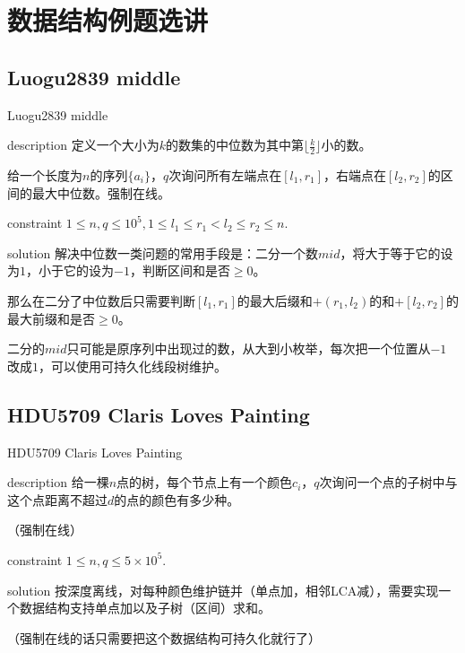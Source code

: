 \documentclass{beamer}
\begin{document}
\section{数据结构例题选讲}
\subsection{Luogu2839 middle}
\begin{frame}{Luogu2839 middle}
\begin{block}{description}
	定义一个大小为$k$的数集的中位数为其中第$\lfloor\frac{k}{2}\rfloor$小的数。
	
	给一个长度为$n$的序列$\{a_i\}$，$q$次询问所有左端点在$[l_1,r_1]$，右端点在$[l_2,r_2]$的区间的最大中位数。强制在线。
\end{block}
\begin{block}{constraint}
	$1 \le n, q \le 10^5, 1 \le l_1 \le r_1 < l_2 \le r_2 \le n.$
\end{block}
\pause
\begin{block}{solution}
	解决中位数一类问题的常用手段是：二分一个数$mid$，将大于等于它的设为$1$，小于它的设为$-1$，判断区间和是否$\ge 0$。
	
	那么在二分了中位数后只需要判断$[l_1,r_1]$的最大后缀和$+(r_1,l_2)$的和$+[l_2,r_2]$的最大前缀和是否$\ge 0$。
	
	二分的$mid$只可能是原序列中出现过的数，从大到小枚举，每次把一个位置从$-1$改成$1$，可以使用可持久化线段树维护。
\end{block}
\end{frame}
\subsection{HDU5709 Claris Loves Painting}
\begin{frame}{HDU5709 Claris Loves Painting}
\begin{block}{description}
给一棵$n$点的树，每个节点上有一个颜色$c_i$，$q$次询问一个点的子树中与这个点距离不超过$d$的点的颜色有多少种。

（强制在线）
\end{block}
\begin{block}{constraint}
$1 \le n, q \le 5\times 10^5.$
\end{block}
\pause
\begin{block}{solution}
按深度离线，对每种颜色维护链并（单点加，相邻LCA减），需要实现一个数据结构支持单点加以及子树（区间）求和。

（强制在线的话只需要把这个数据结构可持久化就行了）
\end{block}
\end{frame}
\end{document}
